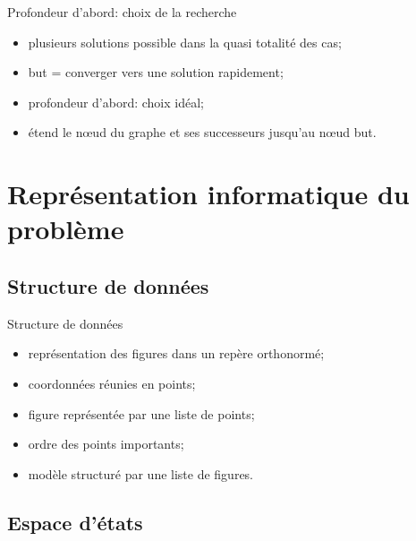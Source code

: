 \documentclass{beamer}
\begin{document}
\begin{frame}{Profondeur d'abord: choix de la recherche}

	\begin{itemize}
		\item plusieurs solutions possible dans la quasi totalité des cas;
		\item but = converger vers une solution rapidement;
		\item profondeur d'abord: choix idéal;
		\item étend le nœud du graphe et ses successeurs jusqu'au nœud but.
	\end{itemize}

\end{frame}

	\section{Représentation informatique du problème}
	
		\subsection{Structure de données}
	
\begin{frame}{Structure de données}

	\begin{itemize}
		\item représentation des figures dans un repère orthonormé;
		\item coordonnées réunies en points;
		\item figure représentée par une liste de points;
		\item ordre des points importants;
		\item modèle structuré par une liste de figures.
	\end{itemize}

\end{frame}

		\subsection{Espace d'états}
		
\end{document}
